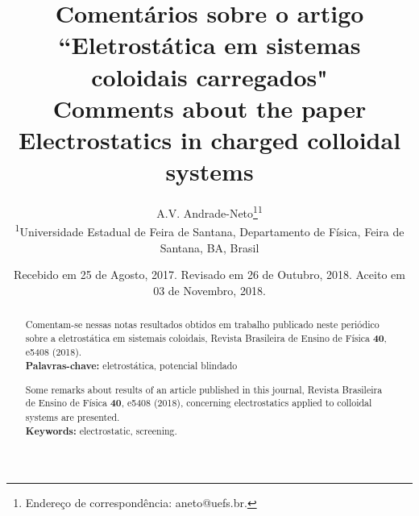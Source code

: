 \documentclass[brazilian,10.7pt,a4paper]{article}
\title{\textbf{Comentários sobre o artigo ``Eletrostática em sistemas coloidais carregados"}\\
\vspace{5pt}\small{\textbf{Comments about the paper Electrostatics in charged colloidal systems}}\vspace{-3pt}}
\author{A.V. Andrade-Neto\footnote{Endereço de correspondência: aneto@uefs.br.}\hspace{5pt}\textsuperscript{1}\vspace{7pt}\\ 
\small{\textsuperscript{1}Universidade Estadual de Feira de Santana, Departamento de Física, Feira de Santana, BA, Brasil}\vspace{6pt}}
\date{\small{Recebido em 25 de Agosto, 2017. Revisado em 26 de Outubro, 2018. Aceito em 03 de Novembro, 2018.}\vspace{-45pt}}
\begin{document}
\renewcommand{\abstractname}{}
\frenchspacing
\maketitle
\begin{abstract}
Comentam-se nessas notas resultados obtidos em trabalho publicado neste periódico sobre a eletrostática em
sistemais coloidais, Revista Brasileira de Ensino de Física \textbf{40}, e5408 (2018).\\
\textbf{Palavras-chave:} eletrostática, potencial blindado\\
\par
Some remarks about results of an article published in this journal, Revista Brasileira de Ensino de Física \textbf{40},
e5408 (2018), concerning electrostatics applied to colloidal systems are presented.\\
\textbf{Keywords:} electrostatic, screening.\\
\end{abstract}
\end{document}
